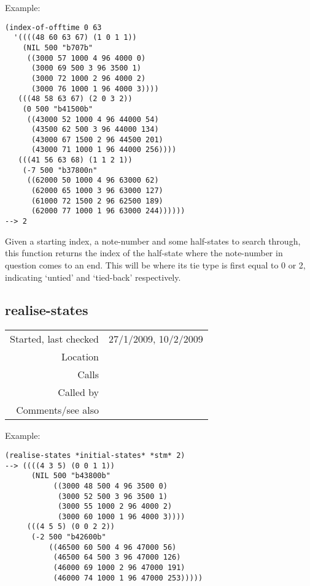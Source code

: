 \vspace{0.5cm}
\noindent Example:
\begin{verbatim}
(index-of-offtime 0 63
  '((((48 60 63 67) (1 0 1 1))
    (NIL 500 "b707b"
     ((3000 57 1000 4 96 4000 0)
      (3000 69 500 3 96 3500 1)
      (3000 72 1000 2 96 4000 2)
      (3000 76 1000 1 96 4000 3))))
   (((48 58 63 67) (2 0 3 2))
    (0 500 "b41500b"
     ((43000 52 1000 4 96 44000 54)
      (43500 62 500 3 96 44000 134)
      (43000 67 1500 2 96 44500 201)
      (43000 71 1000 1 96 44000 256))))
   (((41 56 63 68) (1 1 2 1))
    (-7 500 "b37800n"
     ((62000 50 1000 4 96 63000 62)
      (62000 65 1000 3 96 63000 127)
      (61000 72 1500 2 96 62500 189)
      (62000 77 1000 1 96 63000 244))))))
--> 2
\end{verbatim}

\noindent Given a starting index, a note-number and
some half-states to search through, this function
returns the index of the half-state where the
note-number in question comes to an end. This will be
where its tie type is first equal to 0 or 2,
indicating `untied' and `tied-back' respectively.


\subsection*{realise-states}\label{fun:realise-states}

\vspace{0.3cm}
\begin{tabular}{r|p{8cm}}
Started, last checked & 27/1/2009, 10/2/2009 \\
Location & \nameref{sec:markov-compose} \\
Calls & \nameref{fun:choose-one} \\
Called by & \\
Comments/see also &
\end{tabular}

\vspace{0.5cm}
\noindent Example:
\begin{verbatim}
(realise-states *initial-states* *stm* 2)
--> ((((4 3 5) (0 0 1 1))
      (NIL 500 "b43800b"
           ((3000 48 500 4 96 3500 0)
            (3000 52 500 3 96 3500 1)
            (3000 55 1000 2 96 4000 2)
            (3000 60 1000 1 96 4000 3))))
     (((4 5 5) (0 0 2 2))
      (-2 500 "b42600b"
          ((46500 60 500 4 96 47000 56)
           (46500 64 500 3 96 47000 126)
           (46000 69 1000 2 96 47000 191)
           (46000 74 1000 1 96 47000 253)))))
\end{verbatim}

